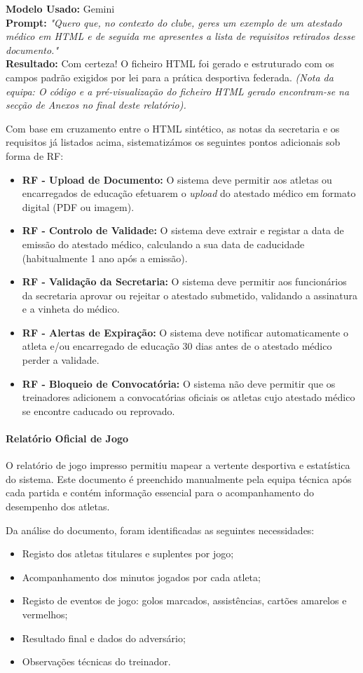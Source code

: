 \documentclass[a4paper,12pt]{scrreprt}
\newcommand{\caixaprompt}[3]{
    \begin{tcolorbox}[
        enhanced,
        colback=azulclaro,      %
        colframe=blue!50!black, %
        arc=2mm,                %
        boxrule=0.5mm,          %
        title=\textbf{Documentação de IA}, %
        fonttitle=\sffamily,
        coltitle=black,
        attach title to upper,
        after title={\par\medskip},
    ]
        \textbf{Modelo Usado:} #1 \\
        \textbf{Prompt:} \textit{"#2"} \\
        \tcbline %
        \textbf{Resultado:} #3
    \end{tcolorbox}
}
\begin{document}
{\caixaprompt{Gemini}{Quero que, no contexto do clube, geres um exemplo de um atestado médico em HTML e de seguida me apresentes a lista de requisitos retirados desse documento.}{Com certeza! O ficheiro HTML foi gerado e estruturado com os campos padrão exigidos por lei para a prática desportiva federada. \textit{(Nota da equipa: O código e a pré-visualização do ficheiro HTML gerado encontram-se na secção de Anexos no final deste relatório).}}



Com base em cruzamento entre o HTML sintético, as notas da secretaria e os requisitos já listados acima, sistematizámos os seguintes pontos adicionais sob forma de RF:
\begin{itemize}
    \item \textbf{RF - Upload de Documento:} O sistema deve permitir aos atletas ou encarregados de educação efetuarem o \textit{upload} do atestado médico em formato digital (PDF ou imagem).
    \item \textbf{RF - Controlo de Validade:} O sistema deve extrair e registar a data de emissão do atestado médico, calculando a sua data de caducidade (habitualmente 1 ano após a emissão).
    \item \textbf{RF - Validação da Secretaria:} O sistema deve permitir aos funcionários da secretaria aprovar ou rejeitar o atestado submetido, validando a assinatura e a vinheta do médico.
    \item \textbf{RF - Alertas de Expiração:} O sistema deve notificar automaticamente o atleta e/ou encarregado de educação 30 dias antes de o atestado médico perder a validade.
    \item \textbf{RF - Bloqueio de Convocatória:} O sistema não deve permitir que os treinadores adicionem a convocatórias oficiais os atletas cujo atestado médico se encontre caducado ou reprovado.
\end{itemize}

\paragraph{Relatório Oficial de Jogo}

O relatório de jogo impresso permitiu mapear a vertente desportiva e estatística do sistema. Este documento é preenchido manualmente pela equipa técnica após cada partida e contém informação essencial para o acompanhamento do desempenho dos atletas.

Da análise do documento, foram identificadas as seguintes necessidades:
\begin{itemize}
    \item Registo dos atletas titulares e suplentes por jogo;
    \item Acompanhamento dos minutos jogados por cada atleta;
    \item Registo de eventos de jogo: golos marcados, assistências, cartões amarelos e vermelhos;
    \item Resultado final e dados do adversário;
    \item Observações técnicas do treinador.
\end{itemize}

}
\end{document}
